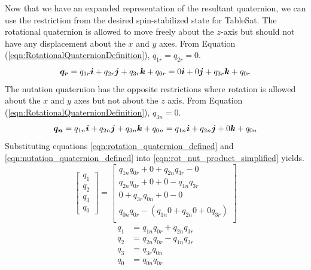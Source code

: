 Now that we have an expanded representation of the resultant quaternion, we can use the restriction from the desired spin-stabilized state for TableSat.  The rotational quaternion is allowed to move freely about the $z$-axis but should not have any displacement about the $x$ and $y$ axes.  From Equation (\ref{eqn:RotationalQuaternionDefinition}), $q_{1r} = q_{2r} = 0$.
\begin{equation}
  \boldsymbol{q_{r}}
  = q_{1r} \boldsymbol{i} + q_{2r} \boldsymbol{j} + q_{3r} \boldsymbol{k} + q_{0r}
  = 0 \boldsymbol{i} + 0 \boldsymbol{j} + q_{3r} \boldsymbol{k} + q_{0r}
  \label{eqn:rotation_quaternion_defined}
\end{equation}
The nutation quaternion has the opposite restrictions where rotation is allowed about the $x$ and $y$ axes but not about the $z$ axis.  From Equation (\ref{eqn:RotationalQuaternionDefinition}), $q_{3n} = 0$.
\begin{equation}
  \boldsymbol{q_{n}}
  = q_{1n} \boldsymbol{i} + q_{2n} \boldsymbol{j} + q_{3n} \boldsymbol{k} + q_{0n}
  = q_{1n} \boldsymbol{i} + q_{2n} \boldsymbol{j} + 0 \boldsymbol{k} + q_{0n}
  \label{eqn:nutation_quaternion_defined}
\end{equation}
Substituting equations \eqref{eqn:rotation_quaternion_defined} and \eqref{eqn:nutation_quaternion_defined} into \eqref{eqn:rot_nut_product_simplified} yields.
\begin{equation}
  \begin{bmatrix}
    q_{1} \\
    q_{2} \\
    q_{3} \\
    q_{0}
  \end{bmatrix}
  =
  \begin{bmatrix}
    q_{1n} q_{0r} + 0             + q_{2n} q_{3r} - 0 \\
    q_{2n} q_{0r} + 0             + 0             - q_{1n} q_{3r} \\
    0             + q_{3r} q_{0n} + 0             - 0 \\
  q_{0n} q_{0r} - (q_{1n} 0 + q_{2n} 0 + 0 q_{3r} ) \\
  \end{bmatrix}
\end{equation}
\begin{subequations}
  \begin{align}
    q_{1} &= q_{1n} q_{0r} + q_{2n} q_{3r} \label{eqn:rot_nut_1_1} \\
    q_{2} &= q_{2n} q_{0r} - q_{1n} q_{3r} \label{eqn:rot_nut_1_2} \\
    q_{3} &= q_{3r} q_{0n} \label{eqn:rot_nut_1_3} \\
    q_{0} &= q_{0n} q_{0r} \label{eqn:rot_nut_1_0}
  \end{align}
\end{subequations}
